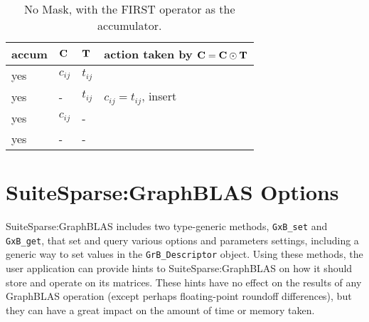 \documentclass[12pt]{article}
\begin{document}
\begin{table}[h]
\begin{center}
{\small
\begin{tabular}{lll|l}
\hline
       accum & ${\bf C}$ & ${\bf T}$        & action taken by ${\bf C = C \odot T}$ \\
\hline
        yes & $c_{ij}$ & $t_{ij}$         &  \\ 
        yes &  -       & $t_{ij}$         &  $c_{ij} = t_{ij}$, insert \\
        yes & $c_{ij}$ &  -               &   \\
        yes &  -       &  -               &   \\
\hline
\end{tabular}
}
\caption{No Mask, with the FIRST operator as the accumulator.
\label{tab:maskaccum_nomask_1st}}
\end{center}
\end{table}

\newpage
\section{SuiteSparse:GraphBLAS Options} %
\label{options}

SuiteSparse:GraphBLAS includes two type-generic methods, \verb'GxB_set' and
\verb'GxB_get', that set and query various options and parameters settings,
including a generic way to set values in the \verb'GrB_Descriptor' object.
Using these methods, the user application can provide hints to
SuiteSparse:GraphBLAS on how it should store and operate on its matrices.
These hints have no effect on the results of any GraphBLAS operation (except
perhaps floating-point roundoff differences), but they can have a great impact
on the amount of time or memory taken.
\end{document}
